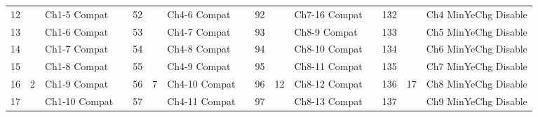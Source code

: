 \documentclass[]{article}
\begin{document}
\begin{landscape}
\begin{table}[]
\begin{tabular}{lllllllllllllll}
			12           &                     & Ch1-5  Compat                  &                    & 52           &                      & Ch4-6  Compat     &  & 92           &                      & Ch7-16  Compat    &  & 132                                                                                             &                                              & Ch4 MinYeChg Disable                               \\
			13           &                     & Ch1-6  Compat                  &                    & 53           &                      & Ch4-7  Compat     &  & 93           &                      & Ch8-9  Compat     &  & 133                                                                                             &                                              & Ch5 MinYeChg Disable                               \\
			14           &                     & Ch1-7  Compat                  &                    & 54           &                      & Ch4-8  Compat     &  & 94           &                      & Ch8-10  Compat    &  & 134                                                                                             &                                              & Ch6 MinYeChg Disable                               \\
			15           &                     & Ch1-8  Compat                  &                    & 55           &                      & Ch4-9  Compat     &  & 95           &                      & Ch8-11  Compat    &  & 135                                                                                             &                                              & Ch7 MinYeChg Disable                               \\
			16           & \multirow{-8}{*}{2} & Ch1-9  Compat                  &                    & 56           & \multirow{-8}{*}{7}  & Ch4-10  Compat    &  & 96           & \multirow{-8}{*}{12} & Ch8-12  Compat    &  & 136                                                                                             & \multirow{-8}{*}{17}                         & Ch8 MinYeChg Disable                               \\ \cline{1-3} \cline{5-7} \cline{9-11} \cline{13-15} 
			17           &                     & Ch1-10  Compat                 &                    & 57           &                      & Ch4-11  Compat    &  & 97           &                      & Ch8-13  Compat    &  & 137                                                                                             &                                              & Ch9 MinYeChg Disable                               \\

\end{tabular}
\end{table}
\end{landscape}
\end{document}
